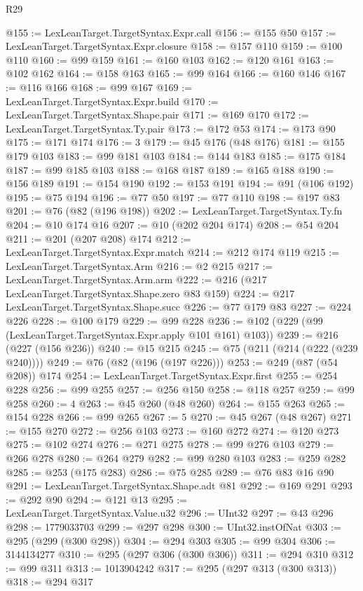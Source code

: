 \begin{lexlean}{R29}
\begin{coremodule}
@155 := LexLeanTarget.TargetSyntax.Expr.call
@156 := @155 @50
@157 := LexLeanTarget.TargetSyntax.Expr.closure
@158 := @157 @110
@159 := @100 @110
@160 := @99 @159
@161 := @160 @103
@162 := @120 @161
@163 := @102 @162
@164 := @158 @163
@165 := @99 @164
@166 := @160 @146
@167 := @116 @166
@168 := @99 @167
@169 := LexLeanTarget.TargetSyntax.Expr.build
@170 := LexLeanTarget.TargetSyntax.Shape.pair
@171 := @169 @170
@172 := LexLeanTarget.TargetSyntax.Ty.pair
@173 := @172 @53
@174 := @173 @90
@175 := @171 @174
@176 := 3
@179 := @45 @176 (@48 @176)
@181 := @155 @179 @103
@183 := @99 @181 @103
@184 := @144 @183
@185 := @175 @184
@187 := @99 @185 @103
@188 := @168 @187
@189 := @165 @188
@190 := @156 @189
@191 := @154 @190
@192 := @153 @191
@194 := @91 (@106 @192)
@195 := @75 @194
@196 := @77 @50
@197 := @77 @110
@198 := @197 @83
@201 := @76 (@82 (@196 @198))
@202 := LexLeanTarget.TargetSyntax.Ty.fn
@204 := @10 @174 @16
@207 := @10 (@202 @204 @174)
@208 := @54 @204
@211 := @201 (@207 @208) @174
@212 := LexLeanTarget.TargetSyntax.Expr.match
@214 := @212 @174 @119
@215 := LexLeanTarget.TargetSyntax.Arm
@216 := @2 @215
@217 := LexLeanTarget.TargetSyntax.Arm.arm
@222 := @216 (@217 LexLeanTarget.TargetSyntax.Shape.zero @83 @159)
@224 := @217 LexLeanTarget.TargetSyntax.Shape.succ
@226 := @77 @179 @83
@227 := @224 @226
@228 := @100 @179
@229 := @99 @228
@236 := @102 (@229 (@99 (LexLeanTarget.TargetSyntax.Expr.apply @101 @161) @103))
@239 := @216 (@227 (@156 @236))
@240 := @15 @215
@245 := @75 (@211 (@214 (@222 (@239 @240))))
@249 := @76 (@82 (@196 (@197 @226)))
@253 := @249 (@87 (@54 @208)) @174
@254 := LexLeanTarget.TargetSyntax.Expr.first
@255 := @254 @228
@256 := @99 @255
@257 := @256 @150
@258 := @118 @257
@259 := @99 @258
@260 := 4
@263 := @45 @260 (@48 @260)
@264 := @155 @263
@265 := @154 @228
@266 := @99 @265
@267 := 5
@270 := @45 @267 (@48 @267)
@271 := @155 @270
@272 := @256 @103
@273 := @160 @272
@274 := @120 @273
@275 := @102 @274
@276 := @271 @275
@278 := @99 @276 @103
@279 := @266 @278
@280 := @264 @279
@282 := @99 @280 @103
@283 := @259 @282
@285 := @253 (@175 @283)
@286 := @75 @285
@289 := @76 @83 @16 @90
@291 := LexLeanTarget.TargetSyntax.Shape.adt @81
@292 := @169 @291
@293 := @292 @90
@294 := @121 @13
@295 := LexLeanTarget.TargetSyntax.Value.u32
@296 := UInt32
@297 := @43 @296
@298 := 1779033703
@299 := @297 @298
@300 := UInt32.instOfNat
@303 := @295 (@299 (@300 @298))
@304 := @294 @303
@305 := @99 @304
@306 := 3144134277
@310 := @295 (@297 @306 (@300 @306))
@311 := @294 @310
@312 := @99 @311
@313 := 1013904242
@317 := @295 (@297 @313 (@300 @313))
@318 := @294 @317

\end{coremodule}
\end{lexlean}
